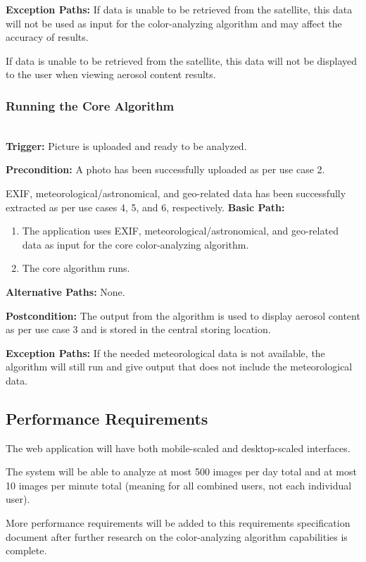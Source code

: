 \documentclass[letterpaper,10pt,draftclsnofoot,onecolumn]{IEEEtran}
\begin{document}
\begin{flushleft}
\textbf{Exception Paths: }
If data is unable to be retrieved from the satellite, this data will not be used as input for the color-analyzing algorithm and may affect the accuracy of results.

If data is unable to be retrieved from the satellite, this data will not be displayed to the user when viewing aerosol content results.

\bigskip

\subsubsection{Running the Core Algorithm} \ \\

\textbf{Trigger: }
Picture is uploaded and ready to be analyzed.

\textbf{Precondition: }
A photo has been successfully uploaded as per use case 2.

EXIF, meteorological/astronomical, and geo-related data has been successfully extracted as per use cases 4, 5, and 6, respectively.
\textbf{Basic Path: }
\begin{enumerate}
	\item The application uses EXIF, meteorological/astronomical, and geo-related data as input for the core color-analyzing algorithm.
	\item The core algorithm runs.
\end{enumerate}

\textbf{Alternative Paths: }
None.

\textbf{Postcondition: }
The output from the algorithm is used to display aerosol content as per use case 3 and is stored in the central storing location.

\textbf{Exception Paths: }
If the needed meteorological data is not available, the algorithm will still run and give output that does not include the meteorological data.

\subsection{Performance Requirements}
The web application will have both mobile-scaled and desktop-scaled interfaces.

The system will be able to analyze at most 500 images per day total and at most 10 images per minute total (meaning for all combined users, not each individual user).

More performance requirements will be added to this requirements specification document after further research on the color-analyzing algorithm capabilities is complete.


\end{flushleft}
\end{document}

